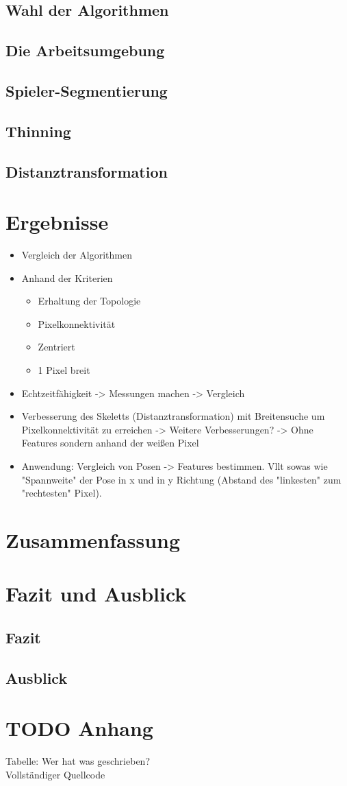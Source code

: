 \documentclass[appendixprefix,a4paper,bibliography=totoc,twoside=true,11pt,DIV=11,BCOR=6mm,headsepline,pointlessnumbers]{scrbook}
\begin{document}
\section{Wahl der Algorithmen}
\section{Die Arbeitsumgebung}
\section{Spieler-Segmentierung}
\section{Thinning}
\section{Distanztransformation}
\chapter{Ergebnisse}
\begin{itemize}
	\item Vergleich der Algorithmen
	\item Anhand der Kriterien
	\begin{itemize}
		\item Erhaltung der Topologie
		\item Pixelkonnektivität
		\item Zentriert
		\item 1 Pixel breit
	\end{itemize}
	\item Echtzeitfähigkeit -> Messungen machen -> Vergleich
	\item Verbesserung des Skeletts (Distanztransformation) mit Breitensuche um Pixelkonnektivität zu erreichen -> Weitere Verbesserungen? -> Ohne Features sondern anhand der weißen Pixel
	\item Anwendung: Vergleich von Posen -> Features bestimmen. Vllt sowas wie "Spannweite" der Pose in x und in y Richtung (Abstand des "linkesten" zum "rechtesten" Pixel). 
\end{itemize}
\chapter{Zusammenfassung}
\chapter{Fazit und Ausblick}
\section{Fazit}
\section{Ausblick}
\chapter{TODO Anhang}
Tabelle: Wer hat was geschrieben?\\
Vollständiger Quellcode
\end{document}
